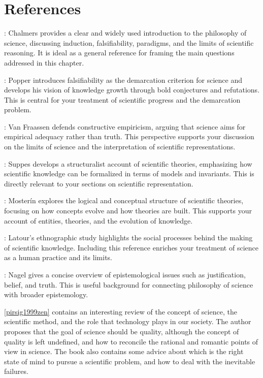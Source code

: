 %
%

\section*{References}

\cite{chalmers2013thing}: Chalmers provides a clear and widely used introduction to the philosophy of science, discussing induction, falsifiability, paradigms, and the limits of scientific reasoning. It is ideal as a general reference for framing the main questions addressed in this chapter.

\cite{popper2014conjectures}: Popper introduces falsifiability as the demarcation criterion for science and develops his vision of knowledge growth through bold conjectures and refutations. This is central for your treatment of scientific progress and the demarcation problem.

\cite{van1980scientific}: Van Fraassen defends constructive empiricism, arguing that science aims for empirical adequacy rather than truth. This perspective supports your discussion on the limits of science and the interpretation of scientific representations.

\cite{suppes2002representation}: Suppes develops a structuralist account of scientific theories, emphasizing how scientific knowledge can be formalized in terms of models and invariants. This is directly relevant to your sections on scientific representation.

\cite{mosterin2016conceptos}: Mosterín explores the logical and conceptual structure of scientific theories, focusing on how concepts evolve and how theories are built. This supports your account of entities, theories, and the evolution of knowledge.

\cite{latour2013laboratory}: Latour's ethnographic study highlights the social processes behind the making of scientific knowledge. Including this reference enriches your treatment of science as a human practice and its limits.

\cite{nagel2014knowledge}: Nagel gives a concise overview of epistemological issues such as justification, belief, and truth. This is useful background for connecting philosophy of science with broader epistemology.

\ref{pirsig1999zen} contains an interesting review of the concept of science, the scientific method, and the role that technology plays in our society. The author proposes that the goal of science should be quality, although the concept of quality is left undefined, and how to reconcile the rational and romantic points of view in science. The book also contains some advice about which is the right state of mind to pursue a scientific problem, and how to deal with the inevitable failures.

